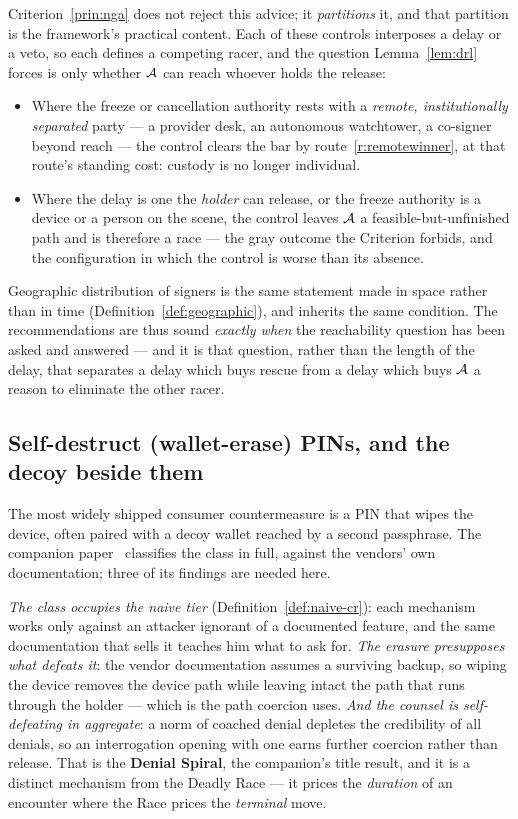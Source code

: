 Criterion~\ref{prin:nga} does not reject this advice; it \emph{partitions} it, and
that partition is the framework's practical content. Each of these controls
interposes a delay or a veto, so each defines a competing racer, and the question
Lemma~\ref{lem:drl} forces is only whether $\mathcal{A}$ can reach whoever holds the
release:
\begin{itemize}[nosep,leftmargin=1.6em]
  \item Where the freeze or cancellation authority rests with a \emph{remote,
        institutionally separated} party --- a provider desk, an autonomous
        watchtower, a co-signer beyond reach --- the control clears the bar by
        route~\ref{r:remotewinner}, at that route's standing cost: custody is no
        longer individual.
  \item Where the delay is one the \emph{holder} can release, or the freeze
        authority is a device or a person on the scene, the control leaves
        $\mathcal{A}$ a feasible-but-unfinished path and is therefore a race --- the
        gray outcome the Criterion forbids, and the configuration in which the
        control is worse than its absence.
\end{itemize}
Geographic distribution of signers is the same statement made in space rather
than in time (Definition~\ref{def:geographic}), and inherits the same condition.
The recommendations are thus sound \emph{exactly when} the reachability question
has been asked and answered --- and it is that question, rather than the length of
the delay, that separates a delay which buys rescue from a delay which buys
$\mathcal{A}$ a reason to eliminate the other racer.

\subsection{Self-destruct (wallet-erase) PINs, and the decoy beside them}
\label{sub:selfdestruct}

The most widely shipped consumer countermeasure is a PIN that wipes the device,
often paired with a decoy wallet reached by a second passphrase. The companion
paper~\cite{denial-spiral} classifies the class in full, against the vendors'
own documentation; three of its findings are needed here.

\emph{The class occupies the naive tier} (Definition~\ref{def:naive-cr}): each
mechanism works only against an attacker ignorant of a documented feature, and
the same documentation that sells it teaches him what to ask for. \emph{The
erasure presupposes what defeats it}: the vendor documentation assumes a
surviving backup, so wiping the device removes the device path while leaving
intact the path that runs through the holder --- which is the path coercion
uses. \emph{And the counsel is self-defeating in aggregate}: a norm of coached
denial depletes the credibility of all denials, so an interrogation opening with
one earns further coercion rather than release. That is the \textbf{Denial
Spiral}, the companion's title result, and it is a distinct mechanism from the
Deadly Race --- it prices the \emph{duration} of an encounter where the Race
prices the \emph{terminal} move.

